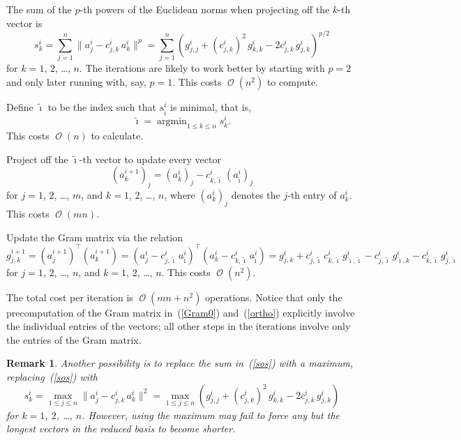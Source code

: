 \documentclass{article}
\newtheorem{remark1}[theorem]{Remark}
\newenvironment{remark}{\begin{remark1} \rm}{\end{remark1}}
\DeclareMathOperator*{\argmin}{argmin}
\DeclareMathOperator{\bigoh}{\mathcal{O}}
\begin{document}
The sum of the $p$-th powers of the Euclidean norms
when projecting off the $k$-th vector is
%
\begin{equation}
\label{sos}
s^i_k = \sum_{j=1}^n \| a^i_j - c^i_{j,k} \, a^i_k \|^p
= \sum_{j=1}^n \left( g^i_{j,j} + (c^i_{j,k})^2 \, g^i_{k,k}
- 2 c^i_{j,k} \, g^i_{j,k} \right)^{p/2}
\end{equation}
%
for $k = 1$, $2$, \dots, $n$.
The iterations are likely to work better by starting with $p = 2$
and only later running with, say, $p = 1$.
This costs $\bigoh(n^2)$ to compute.

Define $\tilde{\imath}$ to be the index such that $s^i_{\tilde{\imath}}$
is minimal, that is,
%
\begin{equation}
\tilde{\imath} = \argmin_{1 \le k \le n} s^i_k.
\end{equation}
%
This costs $\bigoh(n)$ to calculate.

Project off the $\tilde{\imath}$-th vector to update every vector
%
\begin{equation}
\label{ortho}
(a^{i+1}_k)_j
= (a^i_k)_j - c^i_{k,\tilde{\imath}} \, (a^i_{\tilde{\imath}})_j
\end{equation}
%
for $j = 1$, $2$, \dots, $m$, and $k = 1$, $2$, \dots, $n$,
where $(a^i_k)_j$ denotes the $j$-th entry of $a^i_k$.
This costs $\bigoh(mn)$.

Update the Gram matrix via the relation
%
\begin{equation}
\label{Gram_update}
g^{i+1}_{j,k}
= (a^{i+1}_j)^\top (a^{i+1}_k)
= (a^i_j - c^i_{j,\tilde{\imath}} \, a^i_{\tilde{\imath}})^\top
  (a^i_k - c^i_{k,\tilde{\imath}} \, a^i_{\tilde{\imath}})
= g^i_{j,k}
+ c^i_{j,\tilde{\imath}} \, c^i_{k,\tilde{\imath}}
\, g^i_{\tilde{\imath},\tilde{\imath}}
- c^i_{j,\tilde{\imath}} \, g^i_{\tilde{\imath},k}
- c^i_{k,\tilde{\imath}} \, g^i_{j,\tilde{\imath}}
\end{equation}
%
for $j = 1$, $2$, \dots, $n$, and $k = 1$, $2$, \dots, $n$.
This costs $\bigoh(n^2)$.

The total cost per iteration is $\bigoh(mn+n^2)$ operations.
Notice that only the precomputation of the Gram matrix in~(\ref{Gram0})
and~(\ref{ortho}) explicitly involve the individual entries of the vectors;
all other steps in the iterations involve only the entries of the Gram matrix.

\begin{remark}
Another possibility is to replace the sum in~(\ref{sos})
with a maximum, replacing~(\ref{sos}) with
%
\begin{equation}
s^i_k = \max_{1 \le j \le n} \| a^i_j - c^i_{j,k} \, a^i_k \|^2
= \max_{1 \le j \le n} \left( g^i_{j,j} + (c^i_{j,k})^2 \, g^i_{k,k}
- 2 c^i_{j,k} \, g^i_{j,k} \right)
\end{equation}
%
for $k = 1$, $2$, \dots, $n$.
However, using the maximum may fail to force any but the longest vectors
in the reduced basis to become shorter.
\end{remark}
\end{document}
